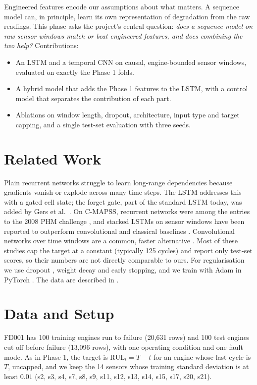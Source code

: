 \documentclass[conference]{IEEEtran}
\begin{document}
Engineered features encode our assumptions about what matters. A sequence model can, in principle, learn its own representation of degradation from the raw readings. This phase asks the project's central question: \emph{does a sequence model on raw sensor windows match or beat engineered features, and does combining the two help?} Contributions:
\begin{itemize}
\item An LSTM and a temporal CNN on causal, engine-bounded sensor windows, evaluated on exactly the Phase 1 folds.
\item A hybrid model that adds the Phase 1 features to the LSTM, with a control model that separates the contribution of each part.
\item Ablations on window length, dropout, architecture, input type and target capping, and a single test-set evaluation with three seeds.
\end{itemize}

\section{Related Work}
Plain recurrent networks struggle to learn long-range dependencies because gradients vanish or explode across many time steps. The LSTM \cite{hochreiter1997lstm} addresses this with a gated cell state; the forget gate, part of the standard LSTM today, was added by Gers et al.\ \cite{gers2000forget}. On C-MAPSS, recurrent networks were among the entries to the 2008 PHM challenge \cite{heimes2008rnn}, and stacked LSTMs on sensor windows have been reported to outperform convolutional and classical baselines \cite{zheng2017lstm}. Convolutional networks over time windows are a common, faster alternative \cite{babu2016cnn,li2018cnn}. Most of these studies cap the target at a constant (typically 125 cycles) and report only test-set scores, so their numbers are not directly comparable to ours. For regularisation we use dropout \cite{srivastava2014dropout}, weight decay and early stopping, and we train with Adam \cite{kingma2015adam} in PyTorch \cite{paszke2019pytorch}. The data are described in \cite{saxena2008damage,saxena2008cmapss}.

\section{Data and Setup}
FD001 has 100 training engines run to failure (20{,}631 rows) and 100 test engines cut off before failure (13{,}096 rows), with one operating condition and one fault mode. As in Phase 1, the target is $\mathrm{RUL}_t = T - t$ for an engine whose last cycle is $T$, uncapped, and we keep the 14 sensors whose training standard deviation is at least $0.01$ (s2, s3, s4, s7, s8, s9, s11, s12, s13, s14, s15, s17, s20, s21).
\end{document}
